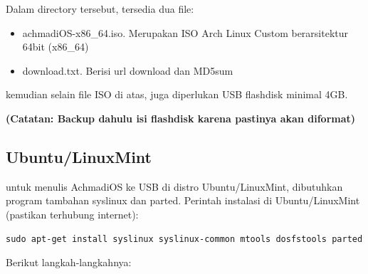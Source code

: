 \documentclass[12pt,]{article}
\begin{document}
	Dalam directory tersebut, tersedia dua file:
	\begin{itemize}
		\item achmadiOS-x86\_64.iso. Merupakan ISO Arch Linux Custom berarsitektur 64bit (x86\_64)
		\item download.txt. Berisi url download dan MD5sum
	\end{itemize}

	kemudian selain file ISO di atas, juga diperlukan USB flashdisk minimal 4GB.
	
	\textbf{(Catatan: Backup dahulu isi flashdisk karena pastinya akan diformat)}

	\subsection{Ubuntu/LinuxMint}
	
	untuk menulis AchmadiOS ke USB di distro Ubuntu/LinuxMint, dibutuhkan program tambahan syslinux dan parted.
	Perintah instalasi di Ubuntu/LinuxMint (pastikan terhubung internet):
	 
	\begin{verbatim}
sudo apt-get install syslinux syslinux-common mtools dosfstools parted
	\end{verbatim}
	
	Berikut langkah-langkahnya:
	
\end{document}
